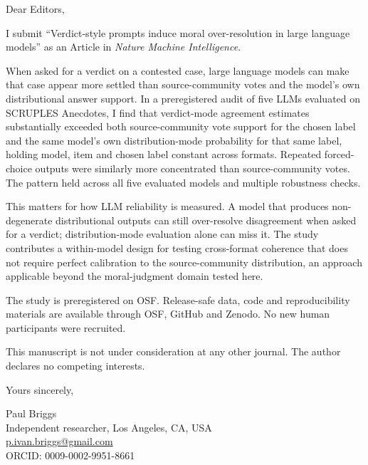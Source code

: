 \documentclass[11pt]{letter}
\begin{document}
Dear Editors,

I submit ``Verdict-style prompts induce moral over-resolution in large language models'' as an Article in \emph{Nature Machine Intelligence}.

When asked for a verdict on a contested case, large language models can make that case appear more settled than source-community votes and the model's own distributional answer support. In a preregistered audit of five LLMs evaluated on SCRUPLES Anecdotes, I find that verdict-mode agreement estimates substantially exceeded both source-community vote support for the chosen label and the same model's own distribution-mode probability for that same label, holding model, item and chosen label constant across formats. Repeated forced-choice outputs were similarly more concentrated than source-community votes. The pattern held across all five evaluated models and multiple robustness checks.

This matters for how LLM reliability is measured. A model that produces non-degenerate distributional outputs can still over-resolve disagreement when asked for a verdict; distribution-mode evaluation alone can miss it. The study contributes a within-model design for testing cross-format coherence that does not require perfect calibration to the source-community distribution, an approach applicable beyond the moral-judgment domain tested here.

The study is preregistered on OSF. Release-safe data, code and reproducibility materials are available through OSF, GitHub and Zenodo. No new human participants were recruited.

This manuscript is not under consideration at any other journal. The author declares no competing interests.

Yours sincerely,

Paul Briggs\\
Independent researcher, Los Angeles, CA, USA\\
\href{mailto:p.ivan.briggs@gmail.com}{p.ivan.briggs@gmail.com}\\
ORCID: 0009-0002-9951-8661
\end{document}
